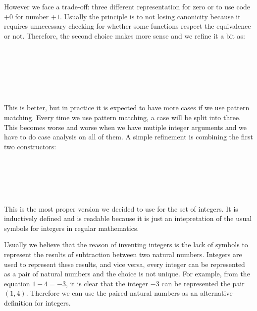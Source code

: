 However we face a trade-off: three different representation for zero or
to use code $+0$ for number $+1$. Usually the principle is to not
losing canonicity because it requires unnecessary checking for whether
some functions respect the equivalence or not. Therefore, the second
choice makes more sense and we refine it a bit as:

\begin{code}
\\
\>  \AgdaSymbol{:}  \<%
\\
\>[0]\<[2]%
\>[2] \AgdaSymbol{:}   \<%
\\
\>[0]\<[2]%
\>[2] \<[8]%
\>[8]\AgdaSymbol{:} \<%
\\
\>[0]\<[2]%
\>[2] \AgdaSymbol{:}   \<%
\\
\>\<\end{code}

This is better, but in practice it is expected to have more cases if
we use pattern matching. Every time we use pattern matching, a case will be
split into three. This becomes worse and worse when we have mutiple integer
arguments and we have to do case analysis on all of them. A simple
refinement is combining the first two constructors:

\begin{code}
\\
\>  \AgdaSymbol{:}  \<%
\\
\>[0]\<[2]%
\>[2]\AgdaInductiveConstructor{+\_} \<[8]%
\>[8]\AgdaSymbol{:}   \<%
\\
\>[0]\<[2]%
\>[2] \AgdaSymbol{:}   \<%
\\
\>\<\end{code}

This is the most proper version we decided to use for the set of integers. It is
inductively defined and is readable because it is just an
intepretation of the usual symbols for integers in regular mathematics.

Usually we believe that the reason of inventing integers is the lack of symbols to
represent the results of subtraction between two
natural numbers. Integers are used to represent these results, and
vice versa,
every integer can be represented as a pair of natural numbers and the
choice is not unique.
For example, from the equation $1 - 4 = - 3$, it is clear that the
integer $- 3$ can be represented the pair $(1,4)$. 
Therefore we can use the paired natural numbers as an alternative
definition for integers.

